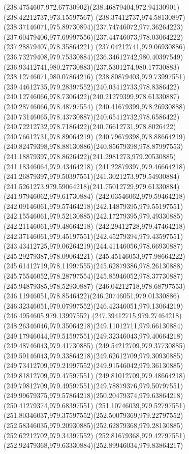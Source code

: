 {{\curveto(238.4754607,972.67730902)(238.46879404,972.94130901)(238.42212737,973.15597567)
\curveto(238.37412737,974.58130897)(238.37146071,975.89730894)(237.74746072,977.36264223)
\curveto(237.60479406,977.69997556)(237.44746073,978.03064222)(237.28879407,978.35864221)
\curveto(237.04212741,979.06930886)(236.73279408,979.75330884)(236.34612742,980.40397549)
\curveto(236.93412741,980.27730883)(237.5301274,980.17730883)(238.12746071,980.07864216)
\curveto(238.80879403,979.73997551)(239.44612735,979.28397552)(240.03412733,978.8386422)
\curveto(240.12746066,978.7306422)(240.21279399,978.61330887)(240.28746066,978.48797554)
\curveto(240.41679399,978.26930888)(240.73146065,978.43730887)(240.65412732,978.6586422)
\curveto(240.72212732,978.7186422)(240.76612731,978.8026422)(240.76612731,978.89064219)
\curveto(240.79679398,978.88664219)(240.82479398,978.88130886)(240.85679398,978.87997553)
\curveto(241.18879397,978.8626422)(241.2981273,979.20530885)(241.18346064,979.43464218)
\curveto(241.22879397,979.46664218)(241.26879397,979.50397551)(241.3021273,979.54930884)
\curveto(241.5261273,979.59064218)(241.75012729,979.61330884)(241.97946062,979.61730884)
\curveto(242.03546062,979.59464218)(242.09146061,979.57464218)(242.14879395,979.55197551)
\curveto(242.15546061,979.52130885)(242.17279395,979.49330885)(242.21146061,979.48664218)
\curveto(242.29412728,979.47464218)(242.37146061,979.45197551)(242.45279394,979.43597551)
\curveto(243.43412725,979.06264219)(244.41146056,978.66930887)(245.29279387,978.09064221)
\curveto(245.45146053,977.98664222)(245.61412719,978.11997555)(245.62879386,978.26130888)
\curveto(245.75546052,978.28797554)(245.85946052,978.37730887)(245.94879385,978.52930887)
\curveto(246.04212718,978.68797553)(246.11946051,978.8546422)(246.20746051,979.01330886)
\curveto(246.32346051,979.07997552)(246.42346051,979.13064219)(246.4954605,979.13997552)
\curveto(247.39412715,979.27464218)(248.26346046,979.35064218)(249.11012711,979.66130884)
\curveto(249.17946044,979.51597551)(249.32346043,979.40664218)(249.48746043,979.41730885)
\curveto(249.54212709,979.37730885)(249.59146043,979.33864218)(249.62612709,979.30930885)
\curveto(249.73412709,979.21997552)(249.91546042,979.36130885)(249.81812709,979.47597551)
\curveto(249.81012709,979.48664218)(249.79812709,979.49597551)(249.78879376,979.50797551)
\curveto(249.99679375,979.57864218)(250.20479374,979.63864218)(250.41279374,979.68397551)
\curveto(251.10746039,979.52797551)(251.80346037,979.37597552)(252.50079369,979.22797552)
\curveto(252.58346035,979.20930885)(252.62879368,979.28130885)(252.62212702,979.34397552)
\curveto(252.81679368,979.42797551)(252.92479368,979.63330884)(252.89946034,979.83864217)
}}
